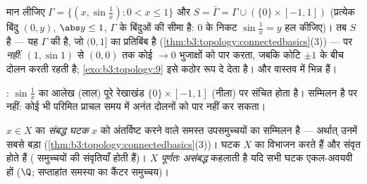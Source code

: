 \begin{example}[संस्थितिविद् का ज्या वक्र]
\label{ex:b3:topology:sinecurve}
मान लीजिए $\Gamma = \{(x, \sin\frac1x) : 0 < x \leq 1\}$ और $S =
\bar\Gamma = \Gamma \cup (\{0\}\times[-1,1])$ (प्रत्येक बिंदु $(0,
y)$, $\abs y \leq 1$, $\Gamma$ के
बिंदुओं की सीमा है: $0$ के निकट $\sin\frac1x = y$ हल कीजिए)। तब $S$
\emph{} है --- यह  $\Gamma$ की  है, जो $(0, 1]$ का
 प्रतिबिंब है (\cref{thm:b3:topology:connectedbasics}(3)) --- पर \emph{ नहीं}: $(1, \sin 1)$
से $(0,0)$ तक कोई  $\to 0$ भुजाक्षों को पार करता, जबकि कोटि $\pm1$
के बीच दोलन करती रहती है; \cref{exo:b3:topology:9} इसे कठोर रूप दे देता है।
 और  वास्तव में भिन्न
हैं।
\end{example}

\begin{omfigure}

{\small {}: $\sin\frac1x$ का आलेख (लाल) पूरे
रेखाखंड $\{0\}\times[-1,1]$ (नीला) पर संचित होता है। सम्मिलन  है पर
 नहीं: कोई भी   परिमित प्राचल समय में अनंत दोलनों
को पार नहीं कर सकता।}
\end{omfigure}

\begin{definition}\label{def:b3:topology:components}
$x
\in X$ का \emph{संबद्ध घटक} $x$ को अंतर्विष्ट
करने वाले समस्त  उपसमुच्चयों का सम्मिलन है --- अर्थात्
उनमें सबसे बड़ा (\cref{thm:b3:topology:connectedbasics}(3))। घटक $X$ का विभाजन करते हैं और
संवृत होते हैं ( समुच्चयों की संवृतियाँ  होती हैं)।
$X$ \emph{पूर्णतः असंबद्ध} कहलाती है यदि सभी घटक एकल-अवयवी हों
($\Q$; सप्ताहांत समस्या का कैंटर समुच्चय)।
\end{definition}

